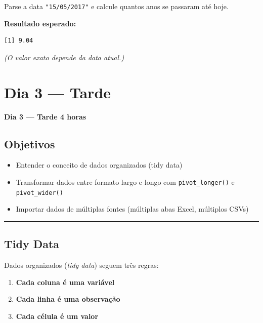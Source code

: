 \documentclass[
  letterpaper,
]{scrbook}
\providecommand{\tightlist}{%
  \setlength{\itemsep}{0pt}\setlength{\parskip}{0pt}}
\begin{document}
Parse a data \texttt{"15/05/2017"} e calcule quantos anos se passaram
até hoje.

\textbf{Resultado esperado:}

\begin{verbatim}
[1] 9.04
\end{verbatim}

\emph{(O valor exato depende da data atual.)}

\chapter{Dia 3 --- Tarde}\label{dia-3-tarde}

\textbf{Dia 3 --- Tarde \textbar{} 4 horas}

\section*{Objetivos}\label{objetivos-5}


\begin{itemize}
\tightlist
\item
  Entender o conceito de dados organizados (tidy data)
\item
  Transformar dados entre formato largo e longo com
  \texttt{pivot\_longer()} e \texttt{pivot\_wider()}
\item
  Importar dados de múltiplas fontes (múltiplas abas Excel, múltiplos
  CSVs)
\end{itemize}

\begin{center}\rule{0.5\linewidth}{0.5pt}\end{center}

\section{Tidy Data}\label{tidy-data}

Dados organizados (\emph{tidy data}) seguem três regras:

\begin{enumerate}
\def\labelenumi{\arabic{enumi}.}
\tightlist
\item
  \textbf{Cada coluna é uma variável}
\item
  \textbf{Cada linha é uma observação}
\item
  \textbf{Cada célula é um valor}
\end{enumerate}
\end{document}
